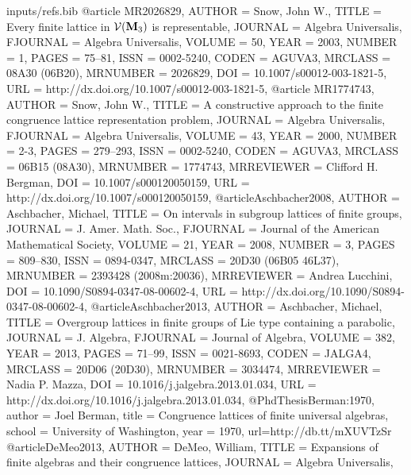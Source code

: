 \begin{filecontents*}{inputs/refs.bib}
@article {MR2026829,
    AUTHOR = {Snow, John W.},
     TITLE = {Every finite lattice in {$\mathcal{V}(\bold M_3)$} is
              representable},
   JOURNAL = {Algebra Universalis},
  FJOURNAL = {Algebra Universalis},
    VOLUME = {50},
      YEAR = {2003},
    NUMBER = {1},
     PAGES = {75--81},
      ISSN = {0002-5240},
     CODEN = {AGUVA3},
   MRCLASS = {08A30 (06B20)},
  MRNUMBER = {2026829},
       DOI = {10.1007/s00012-003-1821-5},
       URL = {http://dx.doi.org/10.1007/s00012-003-1821-5},
}
@article {MR1774743,
    AUTHOR = {Snow, John W.},
     TITLE = {A constructive approach to the finite congruence lattice
              representation problem},
   JOURNAL = {Algebra Universalis},
  FJOURNAL = {Algebra Universalis},
    VOLUME = {43},
      YEAR = {2000},
    NUMBER = {2-3},
     PAGES = {279--293},
      ISSN = {0002-5240},
     CODEN = {AGUVA3},
   MRCLASS = {06B15 (08A30)},
  MRNUMBER = {1774743},
MRREVIEWER = {Clifford H. Bergman},
       DOI = {10.1007/s000120050159},
       URL = {http://dx.doi.org/10.1007/s000120050159},
}
  @article{Aschbacher2008,
    AUTHOR = {Aschbacher, Michael},
     TITLE = {On intervals in subgroup lattices of finite groups},
   JOURNAL = {J. Amer. Math. Soc.},
  FJOURNAL = {Journal of the American Mathematical Society},
    VOLUME = {21},
      YEAR = {2008},
    NUMBER = {3},
     PAGES = {809--830},
      ISSN = {0894-0347},
   MRCLASS = {20D30 (06B05 46L37)},
  MRNUMBER = {2393428 (2008m:20036)},
MRREVIEWER = {Andrea Lucchini},
       DOI = {10.1090/S0894-0347-08-00602-4},
       URL = {http://dx.doi.org/10.1090/S0894-0347-08-00602-4},
  }
  @article{Aschbacher2013,
    AUTHOR = {Aschbacher, Michael},
     TITLE = {Overgroup lattices in finite groups of {L}ie type containing a
              parabolic},
   JOURNAL = {J. Algebra},
  FJOURNAL = {Journal of Algebra},
    VOLUME = {382},
      YEAR = {2013},
     PAGES = {71--99},
      ISSN = {0021-8693},
     CODEN = {JALGA4},
   MRCLASS = {20D06 (20D30)},
  MRNUMBER = {3034474},
MRREVIEWER = {Nadia P. Mazza},
       DOI = {10.1016/j.jalgebra.2013.01.034},
       URL = {http://dx.doi.org/10.1016/j.jalgebra.2013.01.034},
  }
  @PhdThesis{Berman:1970,
    author = 	 {Joel Berman},
    title = 	 {Congruence lattices of finite universal algebras},
    school = 	 {University of Washington},
    year = 	 {1970},
    url={http://db.tt/mXUVTzSr}
  }
  @article{DeMeo2013},
    AUTHOR = {DeMeo, William},
     TITLE = {Expansions of finite algebras and their congruence lattices},
   JOURNAL = {Algebra Universalis},

\end{filecontents*}
